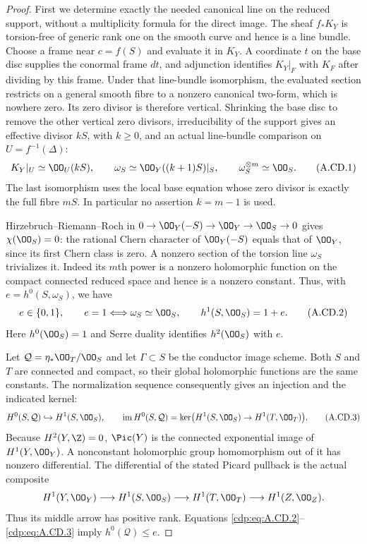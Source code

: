 \begin{proof}
First we determine exactly the needed canonical line on
the reduced support, without a multiplicity formula for
the direct image. The sheaf $f_*K_Y$ is torsion-free of
generic rank one on the smooth curve and hence is a
line bundle. Choose a frame near $c=f(S)$ and evaluate
it in $K_Y$. A coordinate $t$ on the base disc supplies
the conormal frame $dt$, and adjunction identifies
$K_Y|_F$ with $K_F$ after dividing by this frame.
Under that line-bundle isomorphism, the evaluated
section restricts on a general smooth fibre to a
nonzero canonical two-form, which is nowhere zero.
Its zero divisor is therefore
vertical. Shrinking the base disc to remove the other
vertical zero divisors, irreducibility of the support
gives an effective divisor $kS$, with $k\ge0$, and an
actual line-bundle comparison on $U=f^{-1}(\Delta)$:
\[
 K_Y|_U\simeq\OO_U(kS),\qquad
 \omega_S\simeq\OO_Y((k+1)S)|_S,\qquad
 \omega_S^{\otimes m}\simeq\OO_S.                 \tag{A.CD.1}\label{cdp:eq:A.CD.1}
\]
The last isomorphism uses the local base equation whose
zero divisor is exactly the full fibre $mS$.
In particular no assertion $k=m-1$ is used.

Hirzebruch--Riemann--Roch in
$0\to\OO_Y(-S)\to\OO_Y\to\OO_S\to0$ gives
$\chi(\OO_S)=0$: the rational Chern character of
$\OO_Y(-S)$ equals that of $\OO_Y$, since its first
Chern class is zero. A nonzero section of the torsion
line $\omega_S$ trivializes it. Indeed its $m$th power
is a nonzero holomorphic function on the compact
connected reduced space and hence is a nonzero constant.
Thus, with $e=h^0(S,\omega_S)$, we have
\[
 e\in\{0,1\},\qquad
 e=1\Longleftrightarrow\omega_S\simeq\OO_S,
 \qquad h^1(S,\OO_S)=1+e.                         \tag{A.CD.2}\label{cdp:eq:A.CD.2}
\]
Here $h^0(\OO_S)=1$ and Serre duality identifies
$h^2(\OO_S)$ with $e$.

Let $\mathcal Q=\eta_*\OO_T/\OO_S$ and let
$\Gamma\subset S$ be the conductor image scheme.
Both $S$ and $T$ are connected and compact, so their
global holomorphic functions are the same constants.
The normalization sequence consequently gives an
injection and the indicated kernel:
\[
 H^0(S,\mathcal Q)\hookrightarrow H^1(S,\OO_S),
 \qquad
 \operatorname{im}H^0(S,\mathcal Q)
 =\ker\bigl(H^1(S,\OO_S)\to H^1(T,\OO_T)\bigr).
                                                               \tag{A.CD.3}\label{cdp:eq:A.CD.3}
\]
Because $H^2(Y,\Z)=0$, $\Pic(Y)$ is the connected
exponential image of $H^1(Y,\OO_Y)$. A nonconstant
holomorphic group homomorphism out of it has nonzero
differential. The differential of the stated Picard
pullback is the actual composite
\[
 H^1(Y,\OO_Y)\longrightarrow H^1(S,\OO_S)
 \longrightarrow H^1(T,\OO_T)
 \longrightarrow H^1(Z,\OO_Z).
\]
Thus its middle arrow has positive rank. Equations
\eqref{cdp:eq:A.CD.2}--\eqref{cdp:eq:A.CD.3} imply $h^0(\mathcal Q)\le e$.


\end{proof}
